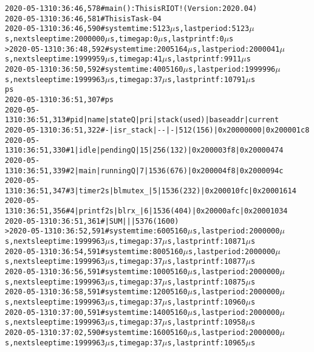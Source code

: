 {\tiny
\begin{alltt}
2020-05-13 10:36:46,578 # main(): This is RIOT! (Version: 2020.04)
2020-05-13 10:36:46,581 # This is Task-04
2020-05-13 10:36:46,590 # system time: 5123 \(\mu\)s, last period: 5123 \(\mu\)s, next sleep time: 2000000 \(\mu\)s, time gap: 0 \(\mu\)s, last printf: 0 \(\mu\)s
> 2020-05-13 10:36:48,592 #  system time: 2005164 \(\mu\)s, last period: 2000041 \(\mu\)s, next sleep time: 1999959 \(\mu\)s, time gap: 41 \(\mu\)s, last printf: 9911 \(\mu\)s
2020-05-13 10:36:50,592 # system time: 4005160 \(\mu\)s, last period: 1999996 \(\mu\)s, next sleep time: 1999963 \(\mu\)s, time gap: 37 \(\mu\)s, last printf: 10791 \(\mu\)s
ps
2020-05-13 10:36:51,307 # ps
2020-05-13 10:36:51,313 # 	pid | name                 | state    Q | pri | stack  ( used) | base addr  | current     
2020-05-13 10:36:51,322 # 	  - | isr_stack            | -        - |   - |    512 (  156) | 0x20000000 | 0x200001c8
2020-05-13 10:36:51,330 # 	  1 | idle                 | pending  Q |  15 |    256 (  132) | 0x200003f8 | 0x20000474 
2020-05-13 10:36:51,339 # 	  2 | main                 | running  Q |   7 |   1536 (  676) | 0x200004f8 | 0x2000094c 
2020-05-13 10:36:51,347 # 	  3 | timer2s              | bl mutex _ |   5 |   1536 (  232) | 0x200010fc | 0x20001614 
2020-05-13 10:36:51,356 # 	  4 | printf2s             | bl rx    _ |   6 |   1536 (  404) | 0x20000afc | 0x20001034 
2020-05-13 10:36:51,361 # 	    | SUM                  |            |     |   5376 ( 1600)
> 2020-05-13 10:36:52,591 #  system time: 6005160 \(\mu\)s, last period: 2000000 \(\mu\)s, next sleep time: 1999963 \(\mu\)s, time gap: 37 \(\mu\)s, last printf: 10871 \(\mu\)s
2020-05-13 10:36:54,591 # system time: 8005160 \(\mu\)s, last period: 2000000 \(\mu\)s, next sleep time: 1999963 \(\mu\)s, time gap: 37 \(\mu\)s, last printf: 10877 \(\mu\)s
2020-05-13 10:36:56,591 # system time: 10005160 \(\mu\)s, last period: 2000000 \(\mu\)s, next sleep time: 1999963 \(\mu\)s, time gap: 37 \(\mu\)s, last printf: 10875 \(\mu\)s
2020-05-13 10:36:58,591 # system time: 12005160 \(\mu\)s, last period: 2000000 \(\mu\)s, next sleep time: 1999963 \(\mu\)s, time gap: 37 \(\mu\)s, last printf: 10960 \(\mu\)s
2020-05-13 10:37:00,591 # system time: 14005160 \(\mu\)s, last period: 2000000 \(\mu\)s, next sleep time: 1999963 \(\mu\)s, time gap: 37 \(\mu\)s, last printf: 10958 \(\mu\)s
2020-05-13 10:37:02,590 # system time: 16005160 \(\mu\)s, last period: 2000000 \(\mu\)s, next sleep time: 1999963 \(\mu\)s, time gap: 37 \(\mu\)s, last printf: 10965 \(\mu\)s
\end{alltt}
}

